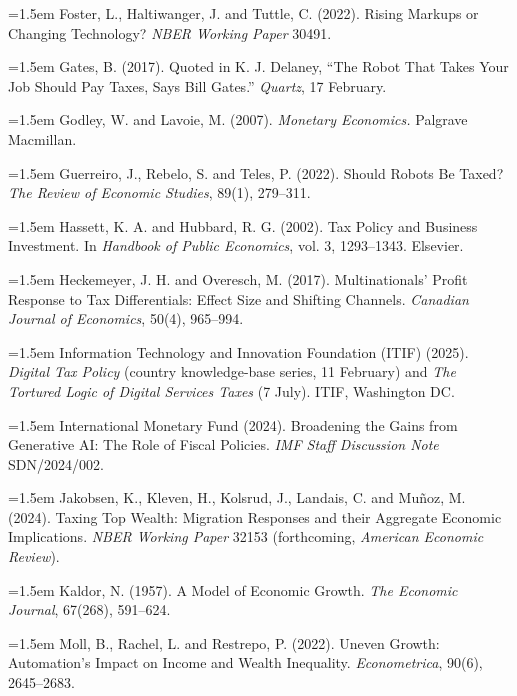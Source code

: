 \documentclass[11pt]{article}
\begin{document}
\hangindent=1.5em Foster, L., Haltiwanger, J. and Tuttle, C. (2022). Rising Markups or Changing Technology? \textit{NBER Working Paper} 30491.\par\addvspace{0.45em}
\hangindent=1.5em Gates, B. (2017). Quoted in K. J. Delaney, ``The Robot That Takes Your Job Should Pay Taxes, Says Bill Gates.'' \textit{Quartz}, 17 February.\par\addvspace{0.45em}
\hangindent=1.5em Godley, W. and Lavoie, M. (2007). \textit{Monetary Economics.} Palgrave Macmillan.\par\addvspace{0.45em}
\hangindent=1.5em Guerreiro, J., Rebelo, S. and Teles, P. (2022). Should Robots Be Taxed? \textit{The Review of Economic Studies}, 89(1), 279--311.\par\addvspace{0.45em}
\hangindent=1.5em Hassett, K. A. and Hubbard, R. G. (2002). Tax Policy and Business Investment. In \textit{Handbook of Public Economics}, vol. 3, 1293--1343. Elsevier.\par\addvspace{0.45em}
\hangindent=1.5em Heckemeyer, J. H. and Overesch, M. (2017). Multinationals' Profit Response to Tax Differentials: Effect Size and Shifting Channels. \textit{Canadian Journal of Economics}, 50(4), 965--994.\par\addvspace{0.45em}
\hangindent=1.5em Information Technology and Innovation Foundation (ITIF) (2025). \textit{Digital Tax Policy} (country knowledge-base series, 11 February) and \textit{The Tortured Logic of Digital Services Taxes} (7 July). ITIF, Washington DC.\par\addvspace{0.45em}
\hangindent=1.5em International Monetary Fund (2024). Broadening the Gains from Generative AI: The Role of Fiscal Policies. \textit{IMF Staff Discussion Note} SDN/2024/002.\par\addvspace{0.45em}
\hangindent=1.5em Jakobsen, K., Kleven, H., Kolsrud, J., Landais, C. and Muñoz, M. (2024). Taxing Top Wealth: Migration Responses and their Aggregate Economic Implications. \textit{NBER Working Paper} 32153 (forthcoming, \textit{American Economic Review}).\par\addvspace{0.45em}
\hangindent=1.5em Kaldor, N. (1957). A Model of Economic Growth. \textit{The Economic Journal}, 67(268), 591--624.\par\addvspace{0.45em}
\hangindent=1.5em Moll, B., Rachel, L. and Restrepo, P. (2022). Uneven Growth: Automation's Impact on Income and Wealth Inequality. \textit{Econometrica}, 90(6), 2645--2683.\par\addvspace{0.45em}
\end{document}

